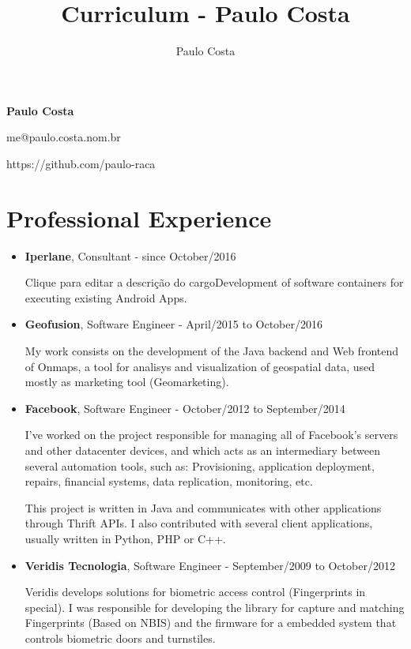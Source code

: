 \documentclass[a4paper,10pt]{article}
\title{Curriculum - Paulo Costa}
\author{Paulo Costa}
\begin{document}
  \LARGE\textbf{Paulo Costa}

  \large me@paulo.costa.nom.br
  
  \large https://github.com/paulo-raca



  \normalsize 
  
  \section{Professional Experience}
    \begin{itemize}
      \item
        \textbf{Iperlane}, Consultant - since October/2016

        Clique para editar a descrição do cargoDevelopment of software containers for executing existing Android Apps.

      \item
        \textbf{Geofusion}, Software Engineer - April/2015 to October/2016
        
        My work consists on the development of the Java backend and Web frontend of Onmaps, a tool for analisys and visualization of geospatial data, used mostly as marketing tool (Geomarketing).

      \item
        \textbf{Facebook}, Software Engineer - October/2012 to September/2014
        
        I've worked on the project responsible for managing all of Facebook's servers and other datacenter devices, and which acts as an intermediary between several automation tools, such as: Provisioning, application deployment, repairs, financial systems, data replication, monitoring, etc.
        
        This project is written in Java and communicates with other applications through Thrift APIs. I also contributed with several client applications, usually written in Python, PHP or C++.

    
      \item  
        \textbf{Veridis Tecnologia}, Software Engineer - September/2009 to October/2012

        Veridis develops solutions for biometric access control (Fingerprints in special). I was responsible for developing the library for capture and  matching Fingerprints (Based on NBIS) and the firmware for a embedded system that controls biometric doors and turnstiles.
        

\end{itemize}
\end{document}
